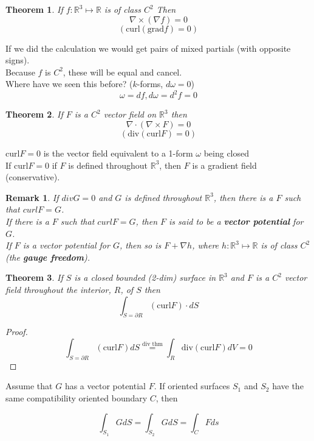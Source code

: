 \documentclass[12pt]{article}
\theoremstyle{plain}
\newtheorem*{remark}{Remark}
\newtheorem{theorem}{Theorem}[section]
\theoremstyle{definition}
\begin{document}
\begin{theorem}
	If $f:\mathbb{R}^3\mapsto\mathbb{R}$ is of class $C^2$ Then
	$$\nabla \times (\nabla f) = 0$$
	$$(\text{curl}(\text{grad} f) = 0)$$
\end{theorem}

If we did the calculation we would get pairs of mixed partials (with opposite signs).\\
Because $f$ is $C^2$, these will be equal and cancel.\\
Where have we seen this before? ($k$-forms, $d\omega = 0$)
$$\omega=df, d\omega = d^2 f = 0$$

\begin{theorem}
	If $F$ is a $C^2$ vector field on $\mathbb{R}^3$ then
	$$\nabla \cdot (\nabla \times F) = 0$$
	$$(\text{div}(\text{curl} F) = 0)$$
\end{theorem}

$\text{curl} F = 0$ is the vector field equivalent to a 1-form $\omega$ being closed\\
If $\text{curl} F = 0$ if $F$ is defined throughout $\mathbb{R}^3$, then $F$ is a gradient field (conservative).

\begin{remark}
	If $div G = 0$ and $G$ is defined throughout $\mathbb{R}^3$, then there is a $F$ such that $curl F = G$.\\
	If there is a $F$ such that $curl F = G$, then $F$ is said to be a \textbf{vector potential} for $G$.\\
	If $F$ is a vector potential for $G$, then so is $F+\nabla h$, where $h:\mathbb{R}^3\mapsto\mathbb{R}$ is of class $C^2$ (the \textbf{gauge freedom}).
\end{remark}

\begin{theorem}
	If $S$ is a closed bounded (2-dim) surface in $\mathbb{R}^3$ and $F$ is a $C^2$ vector field throughout the interior, $R$, of $S$ then
	$$\int_{S = \partial R} (\text{curl} F)\cdot dS$$

\end{theorem}
\begin{proof}
	$$\int_{S = \partial R} (\text{curl} F) dS \overset{\text{div thm}}{=} \int_R \text{div}(\text{curl} F)dV = 0$$
\end{proof}

Assume that $G$ has a vector potential $F$. If oriented surfaces $S_1$ and $S_2$ have the same compatibility oriented boundary $C$, then

$$\int_{S_1} G dS = \int_{S_2} G dS = \int_C F ds$$
\end{document}
